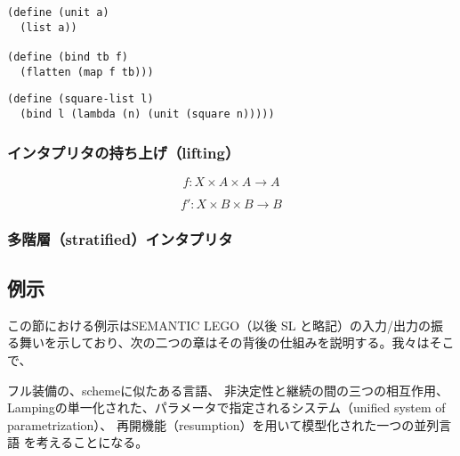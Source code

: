 \documentclass[11pt, oneside]{jsarticle}   	%
\begin{document}


\begin{lstlisting}
(define (unit a)
  (list a))

(define (bind tb f)
  (flatten (map f tb)))
\end{lstlisting}

\begin{lstlisting}
(define (square-list l)
  (bind l (lambda (n) (unit (square n)))))
\end{lstlisting}

\subsubsection{インタプリタの持ち上げ（lifting）}
$$
f : X \times A \times A \rightarrow A
$$

$$
f' : X \times B \times B \rightarrow B
$$

\newpage

\newpage




\subsubsection{多階層（stratified）インタプリタ}

\newpage

\newpage

\newpage

\subsection{例示}
この節における例示はSEMANTIC LEGO（以後 SL と略記）の入力/出力の振る舞いを示しており、次の二つの章はその背後の仕組みを説明する。我々はそこで、

フル装備の、schemeに似たある言語、
非決定性と継続の間の三つの相互作用、
Lampingの単一化された、パラメータで指定されるシステム（unified system of parametrization）、
再開機能（resumption）を用いて模型化された一つの並列言語
を考えることになる。

\newpage

\newpage

\newpage

\newpage
\end{document}
